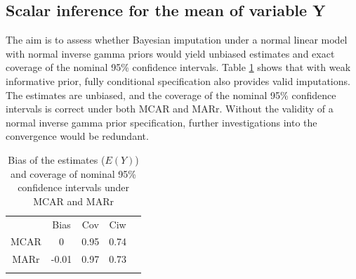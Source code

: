 	\subsection{Scalar inference for the mean of variable Y}
	The aim is to assess whether Bayesian imputation under a normal linear model with normal inverse gamma priors would yield unbiased estimates and exact coverage of the nominal 95\% confidence intervals. Table \ref{tab5_1} shows that with weak informative prior, fully conditional specification also provides valid imputations. The estimates are unbiased, and the coverage of the nominal 95\% confidence intervals is correct under both MCAR and MARr. Without the validity of a normal inverse gamma prior specification, further investigations into the convergence would be redundant. 
	\begin{table}[h]
		\centering
		\vspace{0.5cm}
		\begin{tabular}{ccccc}
			& Bias  & Cov  & Ciw &  \\
			MCAR & 0     & 0.95 & 0.74 &  \\
			MARr & -0.01 & 0.97 & 0.73 &  \\
			&       &      &  & 
		\end{tabular}
		\caption{Bias of the estimates ($E(Y)$) and coverage of nominal 95\% confidence intervals under MCAR and MARr}
		\label{tab5_1}
	\end{table}
	
